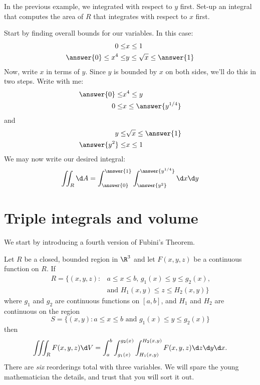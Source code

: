 \documentclass{ximera}
\begin{document}
\begin{question}
  In the previous example, we integrated with respect to $y$
  first. Set-up an integral that computes the area of $R$ that
  integrates with respect to $x$ first.
  \begin{prompt}
    Start by finding overall bounds for our variables. In this case:
    \begin{align*}
      0\le &x \le 1\\
      \answer{0}\le x^4\le &y \le \sqrt{x}\le \answer{1}
    \end{align*}
    Now, write $x$ in terms of $y$. Since $y$ is bounded by $x$ on
    both sides, we'll do this in two steps. Write with me:
    \begin{align*}
      \answer{0}\le &x^4\le y\\
      0 \le &x \le \answer{y^{1/4}}
    \end{align*}
    and
    \begin{align*}
      y\le &\sqrt{x}\le \answer{1}\\
      \answer{y^2} \le &x \le 1
    \end{align*}
    We may now write our desired integral:
    \[
    \iint_R \d A = \int_{\answer{0}}^{\answer{1}}\int_{\answer{y^2}}^{\answer{y^{1/4}}} \d x \d y
    \]
  \end{prompt}
\end{question}


\section{Triple integrals and volume}

We start by introducing a fourth version of Fubini's Theorem.

\begin{theorem}[Fubini]
  Let $R$ be a closed, bounded region in $\R^3$ and let $F(x,y,z)$ be
  a continuous function on $R$. If
    \begin{align*}
      R=\{(x,y,z):&\text{$a\leq x\leq b$, $g_1(x)\leq y\leq g_2(x)$,}\\
        &\text{and $H_1(x,y) \leq z \leq H_2(x,y)$}\}
    \end{align*}
    where $g_1$ and $g_2$ are continuous functions on $[a,b]$, and $H_1$ and $H_2$ are continuous on the region
    \[
    S =\{(x,y):\text{$a\leq x\leq b$ and $g_1(x)\leq y\leq g_2(x)$}\}
    \]
    then
    \[
    \iiint_R F(x,y,z) \d V = \int_a^b\int_{g_1(x)}^{g_2(x)}\int_{H_1(x,y)}^{H_2(x,y)} F(x,y,z)\d z\d y\d x.
    \]
    There are \textit{six} reorderings total with three variables. We will spare
    the young mathematician the details, and trust that you will sort
    it out.
\end{theorem}
\end{document}
